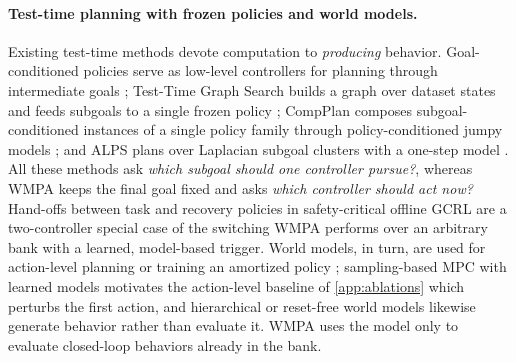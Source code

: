 \documentclass{article}
\theoremstyle{plain}
\theoremstyle{definition}
\theoremstyle{plain}
\newcommand{\wmpa}{\textsc{WMPA}}
\begin{document}
\paragraph{Test-time planning with frozen policies and world models.}
Existing test-time methods devote computation to \emph{producing} behavior. Goal-conditioned policies serve as low-level controllers for planning through intermediate goals \citep{nasiriany2019planning}; Test-Time Graph Search builds a graph over dataset states and feeds subgoals to a single frozen policy \citep{opryshko2026ttgs}; CompPlan composes subgoal-conditioned instances of a single policy family through policy-conditioned jumpy models \citep{farebrother2026compplan}; and ALPS plans over Laplacian subgoal clusters with a one-step model \citep{shehmar2026laplacian}. All these methods ask \emph{which subgoal should one controller pursue?}, whereas \wmpa{} keeps the final goal fixed and asks \emph{which controller should act now?}
 Hand-offs between task and recovery policies in safety-critical offline GCRL \citep{cao2024rbsl} are a two-controller special case of the switching \wmpa{} performs over an arbitrary bank with a learned, model-based trigger. World models, in turn, are used for action-level planning or training an amortized policy \citep{schrittwieser2020muzero,hafner2023dreamerv3}; sampling-based MPC with learned models \citep{williams2017mppi,hansen2022tdmpc} motivates the action-level baseline of \cref{app:ablations} which perturbs the first action, and hierarchical or reset-free world models \citep{schiewer2024hierarchical,yang2024resetfree} likewise generate behavior rather than evaluate it. \wmpa{} uses the model only to evaluate closed-loop behaviors already in the bank.
\end{document}
